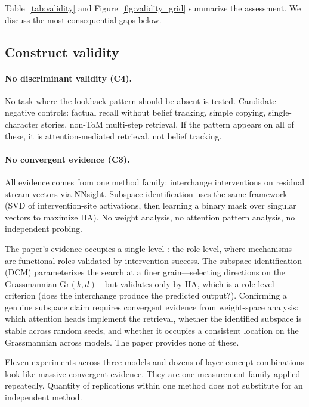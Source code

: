 \documentclass{article}
\begin{document}
Table~\ref{tab:validity} and Figure~\ref{fig:validity_grid} summarize the assessment. We discuss the most consequential gaps below.

\subsection{Construct validity}

\paragraph{No discriminant validity (C4).}
No task where the lookback pattern should be absent is tested. Candidate negative controls: factual recall without belief tracking, simple copying, single-character stories, non-ToM multi-step retrieval. If the pattern appears on all of these, it is attention-mediated retrieval, not belief tracking.

\paragraph{No convergent evidence (C3).}
All evidence comes from one method family: interchange interventions on residual stream vectors via NNsight. Subspace identification uses the same framework (SVD of intervention-site activations, then learning a binary mask over singular vectors to maximize IIA). No weight analysis, no attention pattern analysis, no independent probing.

The paper's evidence occupies a single level \citep{tower2026mechviews}: the role level, where mechanisms are functional roles validated by intervention success. The subspace identification (DCM) parameterizes the search at a finer grain---selecting directions on the Grassmannian $\text{Gr}(k, d)$---but validates only by IIA, which is a role-level criterion (does the interchange produce the predicted output?). Confirming a genuine subspace claim requires convergent evidence from weight-space analysis: which attention heads implement the retrieval, whether the identified subspace is stable across random seeds, and whether it occupies a consistent location on the Grassmannian across models. The paper provides none of these.

Eleven experiments across three models and dozens of layer-concept combinations look like massive convergent evidence. They are one measurement family applied repeatedly. Quantity of replications within one method does not substitute for an independent method.
\end{document}
